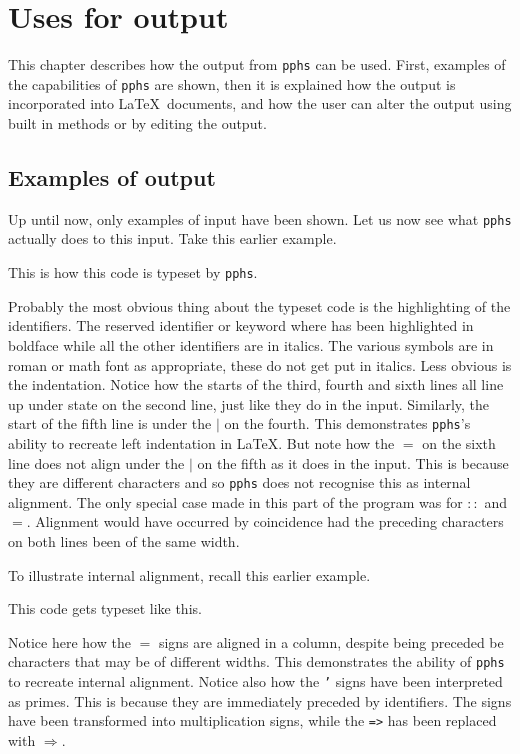 \chapter{Uses for output}

This chapter describes how the output from {\tt pphs} can be used.  First,
examples of the capabilities of {\tt pphs} are shown, then it is explained how
the output is incorporated into \LaTeX\ documents, and how the user can alter
the output using built in methods or by editing the output.

\section{Examples of output} \label{examples}

Up until now, only examples of input have been shown.  Let us now see what
{\tt pphs} actually does to this input.  Take this earlier example.
\begin{quote}

\end{quote}
This is how this code is typeset by {\tt pphs}.
\begin{quote}

\end{quote}
Probably the most obvious thing about the typeset code is the highlighting
of the identifiers.  The reserved identifier or keyword {\keyword where} has been
highlighted in boldface while all the other identifiers are in italics.
The various symbols are in roman or math font as appropriate, these do not
get put in italics.  Less obvious is the indentation.  Notice how the starts
of the third, fourth and sixth lines all line up under {\iden state\/} on the
second line, just like they do in the input.  Similarly, the start of the fifth
line is under the $|$ on the fourth.  This demonstrates {\tt pphs}'s ability to
recreate left indentation in \LaTeX.  But note how the $=$ on the sixth line does
not align under the $|$ on the fifth as it does in the input.  This is because
they are different characters and so {\tt pphs} does not recognise this as internal
alignment.  The only special case made in this part of the program was for $::$ and $=$.
Alignment would have occurred by coincidence had the preceding characters on both lines
been of the same width. 

To illustrate internal alignment, recall this earlier example.
\begin{quote}

\end{quote}
This code gets typeset like this.
\begin{quote}

\end{quote}
Notice here how the $=$ signs are aligned in a column, despite being preceded
be characters that may be of different widths.  This demonstrates the ability of
{\tt pphs} to recreate internal alignment.  Notice also how the {\tt '} signs
have been interpreted as primes.  This is because they are immediately preceded
by identifiers.  The {\tt *} signs have been transformed into multiplication signs,
while the {\tt =>} has been replaced with $\Rightarrow$.


